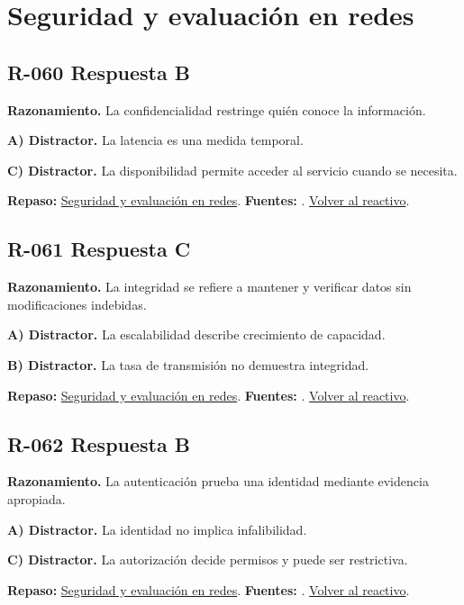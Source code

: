 \section{Seguridad y evaluación en redes}

\subsection*{R-060 \quad Respuesta B}\label{s:R-060}
\textbf{Razonamiento.} La confidencialidad restringe quién conoce la información.

\textbf{A) Distractor. }La latencia es una medida temporal.

\textbf{C) Distractor. }La disponibilidad permite acceder al servicio cuando se necesita.

\textbf{Repaso:} \hyperref[sec:r3]{Seguridad y evaluación en redes}. \textbf{Fuentes:} \cite{nistsecurity,owasp,aes,tls}. \hyperref[q:R-060]{Volver al reactivo}.\par\medskip

\subsection*{R-061 \quad Respuesta C}\label{s:R-061}
\textbf{Razonamiento.} La integridad se refiere a mantener y verificar datos sin modificaciones indebidas.

\textbf{A) Distractor. }La escalabilidad describe crecimiento de capacidad.

\textbf{B) Distractor. }La tasa de transmisión no demuestra integridad.

\textbf{Repaso:} \hyperref[sec:r3]{Seguridad y evaluación en redes}. \textbf{Fuentes:} \cite{nistsecurity,owasp,aes,tls}. \hyperref[q:R-061]{Volver al reactivo}.\par\medskip

\subsection*{R-062 \quad Respuesta B}\label{s:R-062}
\textbf{Razonamiento.} La autenticación prueba una identidad mediante evidencia apropiada.

\textbf{A) Distractor. }La identidad no implica infalibilidad.

\textbf{C) Distractor. }La autorización decide permisos y puede ser restrictiva.

\textbf{Repaso:} \hyperref[sec:r3]{Seguridad y evaluación en redes}. \textbf{Fuentes:} \cite{nistsecurity,owasp,aes,tls}. \hyperref[q:R-062]{Volver al reactivo}.\par\medskip

